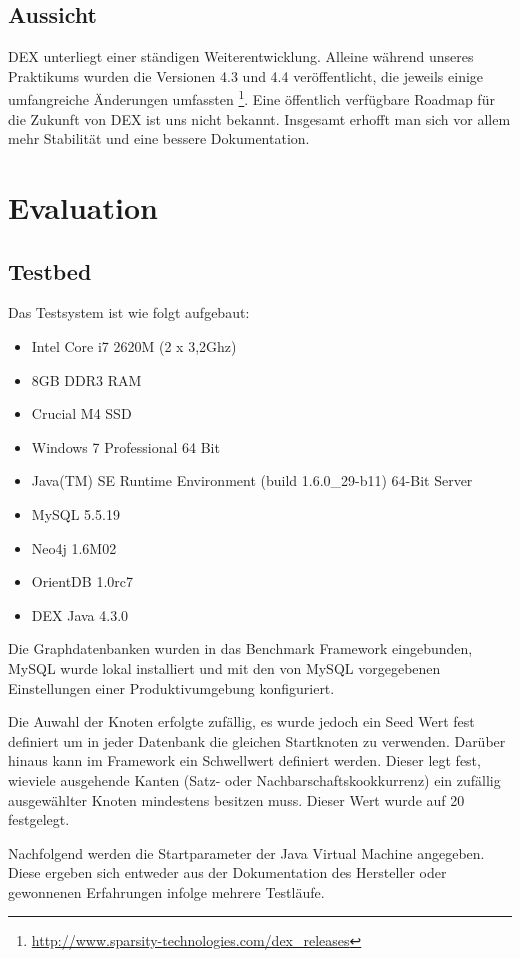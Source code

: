 \documentclass[11pt, a4paper, oneside]{article} %
\begin{document}
\subsection{Aussicht}

DEX unterliegt einer ständigen Weiterentwicklung. Alleine während unseres Praktikums wurden die Versionen 4.3 und 4.4 veröffentlicht, die jeweils einige umfangreiche Änderungen umfassten \footnote{\url{http://www.sparsity-technologies.com/dex_releases}}. Eine öffentlich verfügbare Roadmap für die Zukunft von DEX ist uns nicht bekannt. Insgesamt erhofft man sich vor allem mehr Stabilität und eine bessere Dokumentation.

\section{Evaluation}

\subsection{Testbed}

Das Testsystem ist wie folgt aufgebaut: 
\begin{itemize}
	\item Intel Core i7 2620M (2 x 3,2Ghz)
	\item 8GB DDR3 RAM
	\item Crucial M4 SSD
	\item Windows 7 Professional 64 Bit
	\item Java(TM) SE Runtime Environment (build 1.6.0\_{}29-b11) 64-Bit Server
	\item MySQL 5.5.19
	\item Neo4j 1.6M02
	\item OrientDB 1.0rc7
	\item DEX Java 4.3.0
\end{itemize}
Die Graphdatenbanken wurden in das Benchmark Framework eingebunden, MySQL wurde lokal installiert und mit den von MySQL vorgegebenen Einstellungen einer Produktivumgebung konfiguriert.
\par
Die Auwahl der Knoten erfolgte zufällig, es wurde jedoch ein Seed Wert fest definiert um in jeder Datenbank die gleichen Startknoten zu verwenden. Darüber hinaus kann im Framework ein Schwellwert definiert werden. Dieser legt fest, wieviele ausgehende Kanten (Satz- oder Nachbarschaftskookkurrenz) ein zufällig ausgewählter Knoten mindestens besitzen muss. Dieser Wert wurde auf 20 festgelegt.
\par
Nachfolgend werden die Startparameter der Java Virtual Machine angegeben. Diese ergeben sich entweder aus der Dokumentation des Hersteller oder gewonnenen Erfahrungen infolge mehrere Testläufe.
\end{document}

